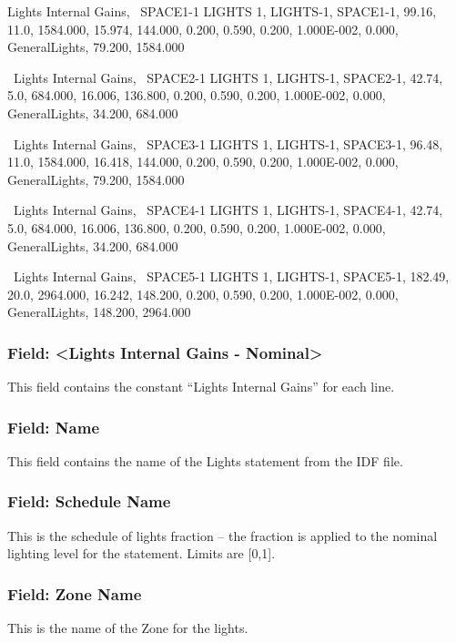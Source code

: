 Lights Internal Gains,~ SPACE1-1 LIGHTS 1, LIGHTS-1, SPACE1-1, 99.16, 11.0, 1584.000, 15.974, 144.000, 0.200, 0.590, 0.200, 1.000E-002, 0.000, GeneralLights, 79.200, 1584.000

~Lights Internal Gains,~ SPACE2-1 LIGHTS 1, LIGHTS-1, SPACE2-1, 42.74, 5.0, 684.000, 16.006, 136.800, 0.200, 0.590, 0.200, 1.000E-002, 0.000, GeneralLights, 34.200, 684.000

~Lights Internal Gains,~ SPACE3-1 LIGHTS 1, LIGHTS-1, SPACE3-1, 96.48, 11.0, 1584.000, 16.418, 144.000, 0.200, 0.590, 0.200, 1.000E-002, 0.000, GeneralLights, 79.200, 1584.000

~Lights Internal Gains,~ SPACE4-1 LIGHTS 1, LIGHTS-1, SPACE4-1, 42.74, 5.0, 684.000, 16.006, 136.800, 0.200, 0.590, 0.200, 1.000E-002, 0.000, GeneralLights, 34.200, 684.000

~Lights Internal Gains,~ SPACE5-1 LIGHTS 1, LIGHTS-1, SPACE5-1, 182.49, 20.0, 2964.000, 16.242, 148.200, 0.200, 0.590, 0.200, 1.000E-002, 0.000, GeneralLights, 148.200, 2964.000

\subsubsection{Field: \textless{}Lights Internal Gains - Nominal\textgreater{}}\label{field-lights-internal-gains---nominal}

This field contains the constant ``Lights Internal Gains'' for each line.

\subsubsection{Field: Name}\label{field-name-2}

This field contains the name of the Lights statement from the IDF file.

\subsubsection{Field: Schedule Name}\label{field-schedule-name-1}

This is the schedule of lights fraction -- the fraction is applied to the nominal lighting level for the statement. Limits are {[}0,1{]}.

\subsubsection{Field: Zone Name}\label{field-zone-name-3}

This is the name of the Zone for the lights.

